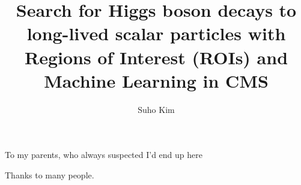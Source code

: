 \documentclass[11pt,expanded,copyright]{fsuthesis}
\title{Search for Higgs boson decays to long-lived scalar particles with Regions of Interest (ROIs) and Machine Learning in CMS}
\author{Suho Kim}  %
\begin{document}
\frontmatter          %
\maketitle            %
\makecommitteepage    %

\begin{dedication}
\centering
To my parents, who always suspected I'd end up here
\end{dedication}

\begin{acknowledgments}
Thanks to many people.
\end{acknowledgments}

\tableofcontents
\listoftables
\listoffigures


\end{document}
